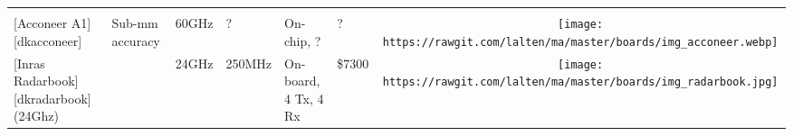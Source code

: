 \begin{longtable}[]{@{}llllllc@{}}
\begin{minipage}[t]{0.10\columnwidth}
\end{minipage}\tabularnewline
\begin{minipage}[t]{0.09\columnwidth}\raggedright\strut
{[}Acconeer A1{]}{[}dkacconeer{]}\strut
\end{minipage} & \begin{minipage}[t]{0.13\columnwidth}\raggedright\strut
Sub-mm accuracy\strut
\end{minipage} & \begin{minipage}[t]{0.09\columnwidth}\raggedright\strut
60GHz\strut
\end{minipage} & \begin{minipage}[t]{0.11\columnwidth}\raggedright\strut
?\strut
\end{minipage} & \begin{minipage}[t]{0.10\columnwidth}\raggedright\strut
On-chip, ?\strut
\end{minipage} & \begin{minipage}[t]{0.15\columnwidth}\raggedright\strut
?\strut
\end{minipage} & \begin{minipage}[t]{0.10\columnwidth}\centering\strut
\texttt{[image: https://rawgit.com/lalten/ma/master/boards/img\_acconeer.webp]}\strut
\end{minipage}\tabularnewline
\begin{minipage}[t]{0.09\columnwidth}\raggedright\strut
{[}Inras Radarbook{]}{[}dkradarbook{]} (24Ghz)\strut
\end{minipage} & \begin{minipage}[t]{0.13\columnwidth}\raggedright\strut
\strut
\end{minipage} & \begin{minipage}[t]{0.09\columnwidth}\raggedright\strut
24GHz\strut
\end{minipage} & \begin{minipage}[t]{0.11\columnwidth}\raggedright\strut
250MHz\strut
\end{minipage} & \begin{minipage}[t]{0.10\columnwidth}\raggedright\strut
On-board, 4 Tx, 4 Rx\strut
\end{minipage} & \begin{minipage}[t]{0.15\columnwidth}\raggedright\strut
\$7300\strut
\end{minipage} & \begin{minipage}[t]{0.10\columnwidth}\centering\strut
\texttt{[image: https://rawgit.com/lalten/ma/master/boards/img\_radarbook.jpg]}\strut

\end{minipage}
\end{longtable}
